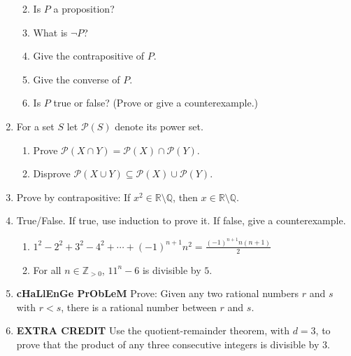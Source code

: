 \documentclass[11pt,letterpaper]{article}
\begin{document}
\begin{enumerate}
\begin{enumerate}
\vspace{1pc}
\item Is $P$ a proposition?

\vspace{4pc}
\item What is $\neg P$?

\vspace{5pc}
\item Give the contrapositive of $P$.

\vspace{5pc}
\item Give the converse of $P$.

\vspace{5pc}
\item Is $P$ true or false? (Prove or give a counterexample.)
\end{enumerate}

\newpage
\item For a set $S$ let $\mathscr P(S)$ denote its power set.
\begin{enumerate}
\item Prove $\mathscr P(X\cap Y)=\mathscr P(X)\cap\mathscr P(Y)$.

\vspace{30pc}
\item Disprove $\mathscr P(X\cup Y)\subseteq\mathscr P(X)\cup\mathscr P(Y)$.
\end{enumerate}

\newpage
\item Prove by contrapositive: If $x^2\in\mathbb R\setminus\mathbb Q$, then $x\in\mathbb R\setminus\mathbb Q$.

\newpage
\item True/False.  If true, use induction to prove it.  If false, give a counterexample.
\begin{enumerate}
\item $1^2-2^2+3^2-4^2+\cdots+(-1)^{n+1}n^2=\frac{(-1)^{n+1}n(n+1)}{2}$

\newpage
\item For all $n\in\mathbb Z_{>0}$, $11^n-6$ is divisible by $5$.
\end{enumerate}

\newpage
\item {\bf cHaLlEnGe PrObLeM} Prove: Given any two rational numbers $r$ and $s$ with $r<s$, there is a rational number between $r$ and $s$.

\newpage
\item {\bf EXTRA CREDIT} Use the quotient-remainder theorem, with $d=3$, to prove that the product of any three consecutive integers is divisible by $3$.

\end{enumerate}
\end{document}
